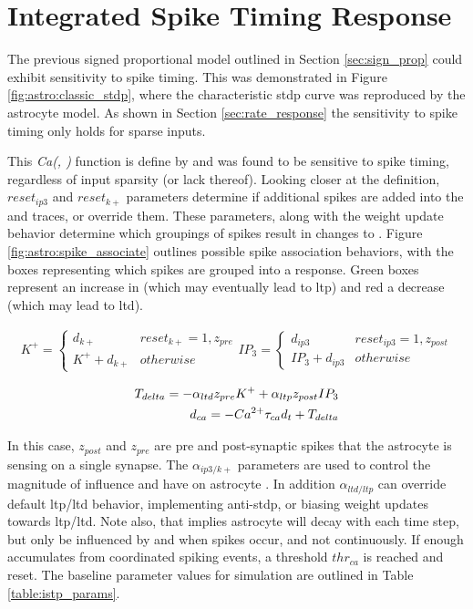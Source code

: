 \section{Integrated Spike Timing Response} \label{section:istp}
The previous signed proportional model outlined in Section
\ref{sec:sign_prop} could exhibit sensitivity to spike timing. This was
demonstrated in Figure \ref{fig:astro:classic_stdp}, where the characteristic
\gls{stdp} curve was reproduced by the astrocyte model. As shown in Section
\ref{sec:rate_response} the sensitivity to spike timing only holds for sparse
inputs.

This \emph{Ca(\ipt, \kp)} function is define by  and was
found to be sensitive to spike timing, regardless of input sparsity (or lack
thereof). Looking closer at the definition, $reset_{ip3}$ and $reset_{k+}$
parameters determine if additional spikes are added into the \ipt and \kp
traces, or override them. These parameters, along with the weight update
behavior determine which groupings of spikes result in changes to \ca. Figure
\ref{fig:astro:spike_associate} outlines possible spike association behaviors,
with the boxes representing which spikes are grouped into a \ca response. Green
boxes represent an increase in \ca (which may eventually lead to \gls{ltp}) and
red a decrease (which may lead to \gls{ltd}).

\begin{align}
  K^+ =
  \begin{cases} 
    d_{k+} & reset_{k+} = 1, z_{pre}
    \\ K^+ + d_{k+} & otherwise
  \end{cases}
  IP_3 =
  \begin{cases} 
    d_{ip3} & reset_{ip3} = 1, z_{post}
    \\ IP_3 + d_{ip3} & otherwise
  \end{cases}
\end{align}


\begin{align}
T_{delta} = -\alpha_{ltd} z_{pre} K^+ + \alpha_{ltp} z_{post} IP_3\\
d_{ca} = -Ca^{2+} \tau_{ca} d_t + T_{delta} \label{eq:astro:temp-u}
\end{align}

In this case, $z_{post}$ and $z_{pre}$ are pre and post-synaptic spikes that
the astrocyte is sensing on a single synapse. The $\alpha_{ip3/k+}$ parameters
are used to control the magnitude of influence \ipt and \kp have on astrocyte
\ca. In addition $\alpha_{ltd/ltp}$ can override default \gls{ltp}/\gls{ltd} behavior,
implementing anti-stdp, or biasing weight updates towards \gls{ltp}/\gls{ltd}. Note also,
that  implies astrocyte \ca will decay with each
time step, but only be influenced by \ipt and \kp when spikes occur, and
not continuously. If enough \ca accumulates from coordinated spiking events, a
threshold $thr_{ca}$ is reached and \ca reset. The baseline parameter values
for simulation are outlined in Table \ref{table:istp_params}.

